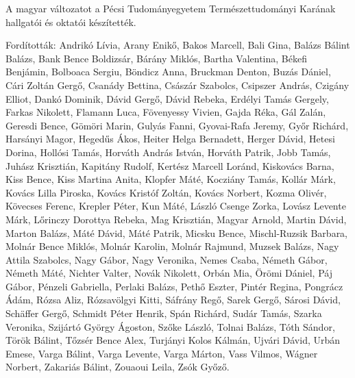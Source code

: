 {
A magyar változatot a Pécsi Tudományegyetem Természettudományi Karának hallgatói és oktatói készítették.

Fordították:
Andrikó Lívia, Arany Enikő,
Bakos Marcell, Bali Gina, Balázs Bálint Balázs, Bank Bence Boldizsár, Bárány Miklós, Bartha Valentina,
Békefi Benjámin, Bolboaca Sergiu, Böndicz Anna, Bruckman Denton, Buzás Dániel,
Cári Zoltán Gergő, Csanády Bettina, Császár Szabolcs, Csipszer András, Czigány Elliot,
Dankó Dominik, Dávid Gergő, Dávid Rebeka,
Erdélyi Tamás Gergely,
Farkas Nikolett, Flamann Luca, Fövenyessy Vivien,
Gajda Réka, Gál Zalán, Geresdi Bence, Gömöri Marin, Gulyás Fanni, Gyovai-Rafa Jeremy, Győr Richárd,
Harsányi Magor, Hegedűs Ákos, Heiter Helga Bernadett, Herger Dávid, Hetesi Dorina, Hollósi Tamás, Horváth András István, Horváth Patrik,
Jobb Tamás, Juhász Krisztián,
Kapitány Rudolf, Kertész Marcell Loránd, Kiskovács Barna, Kiss Bence, Kiss Martina Anita,
Klopfer Máté, Kocziány Tamás, Kollár Márk,
Kovács Lilla Piroska, Kovács Kristóf Zoltán, Kovács Norbert, Kozma Olivér, Kövecses Ferenc, Krepler Péter, Kun Máté,
László Csenge Zorka, Lovász Levente Márk, Lőrinczy Dorottya Rebeka,
Mag Krisztián, Magyar Arnold, Martin Dávid, Marton Balázs, Máté Dávid, Máté Patrik, Micsku Bence, Mischl-Ruzsik Barbara,
Molnár Bence Miklós, Molnár Karolin, Molnár Rajmund, Muzsek Balázs,
Nagy Attila Szabolcs, Nagy Gábor, Nagy Veronika, Nemes Csaba, Németh Gábor, Németh Máté, Nichter Valter, Novák Nikolett,
Orbán Mia, Örömi Dániel,
Páj Gábor, Pénzeli Gabriella, Perlaki Balázs, Pethő Eszter, Pintér Regina, Pongrácz Ádám,
Rózsa Aliz, Rózsavölgyi Kitti,
Sáfrány Regő, Sarek Gergő, Sárosi Dávid, Schäffer Gergő, Schmidt Péter Henrik, Spán Richárd, Sudár Tamás,
Szarka Veronika, Szijártó György Ágoston, Szőke László,
Tolnai Balázs, Tóth Sándor, Török Bálint, Tőzsér Bence Alex, Turjányi Kolos Kálmán, Ujvári Dávid, Urbán Emese,
Varga Bálint, Varga Levente, Varga Márton, Vass Vilmos,
Wágner Norbert,
Zakariás Bálint, Zouaoui Leila,
Zsók Győző.
}